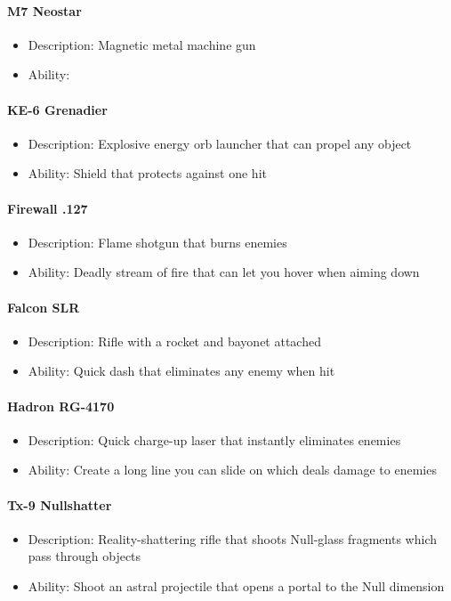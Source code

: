 \documentclass[../Main.tex]{subfiles}
\begin{document}
\paragraph{M7 Neostar}

\begin{itemize}
	\item Description: Magnetic metal machine gun
	\item Ability:
\end{itemize} 


\paragraph{KE-6 Grenadier}
 
\begin{itemize}
	\item Description: Explosive energy orb launcher that can propel any object
	\item Ability: Shield that protects against one hit
\end{itemize} 

\paragraph{Firewall .127}

\begin{itemize}
	\item Description: Flame shotgun that burns enemies
	\item Ability: Deadly stream of fire that can let you hover when aiming down
\end{itemize} 

\paragraph{Falcon SLR}

\begin{itemize}
	\item Description: Rifle with a rocket and bayonet attached
	\item Ability: Quick dash that eliminates any enemy when hit
\end{itemize} 


\paragraph{Hadron RG-4170}

\begin{itemize}
	\item Description: Quick charge-up laser that instantly eliminates enemies
	\item Ability: Create a long line you can slide on which deals damage to enemies
\end{itemize} 


\paragraph{Tx-9 Nullshatter}

\begin{itemize}
	\item Description: Reality-shattering rifle that shoots Null-glass fragments which pass through objects 
	\item Ability: Shoot an astral projectile that opens a portal to the Null dimension
\end{itemize} 
\end{document}
